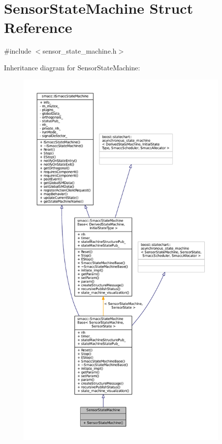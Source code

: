 \hypertarget{structSensorStateMachine}{}\section{Sensor\+State\+Machine Struct Reference}
\label{structSensorStateMachine}


{\ttfamily \#include $<$sensor\+\_\+state\+\_\+machine.\+h$>$}



Inheritance diagram for Sensor\+State\+Machine\+:
\nopagebreak
\begin{figure}[H]
\begin{center}
\leavevmode
\includegraphics[height=550pt]{structSensorStateMachine__inherit__graph}
\end{center}
\end{figure}


